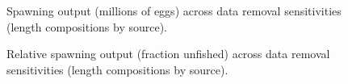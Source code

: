 \documentclass[
]{scrartcl}
\begin{document}
\begin{figure}[H]


\caption{\label{fig-sens_lens2_spout}Spawning output (millions of eggs)
across data removal sensitivities (length compositions by source).}

\end{figure}%

\begin{figure}[H]


\caption{\label{fig-sens_lens2_relsp}Relative spawning output (fraction
unfished) across data removal sensitivities (length compositions by
source).}

\end{figure}%
\end{document}
